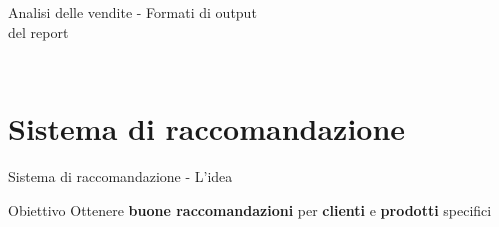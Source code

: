 \documentclass{beamer}
\begin{document}
\begin{frame}{Analisi delle vendite - Formati di output\\ del report}
\begin{columns}
\begin{column}{0.33\textwidth}
\begin{figure}
				\end{figure}
			\end{column}
		\end{columns}
	\end{frame}


	\section{Sistema di raccomandazione}

	\begin{frame}{Sistema di raccomandazione - L'idea}
        \begin{alertblock}{Obiettivo}
			Ottenere \textbf{buone raccomandazioni} per \textbf{clienti} e \textbf{prodotti} specifici
		\end{alertblock}


\end{frame}
\end{document}
